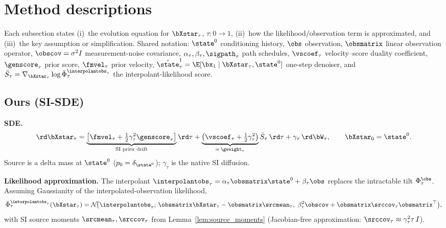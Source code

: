 \section{Method descriptions}\label{appendix:methods}

Each subsection states (i)~the evolution equation for $\bXstar_\tau$, $\tau:0\!\to\!1$, (ii)~how the likelihood/observation term is approximated, and (iii)~the key assumption or simplification.
Shared notation: $\state^0$ conditioning history, $\obs$ observation, $\obsmatrix$ linear observation operator,
$\obscov=\sigma^2 I$ measurement-noise covariance, $\alpha_\tau,\beta_\tau,\sigpath_\tau$ path schedules,
$\vscoef_\tau$ velocity--score duality coefficient, $\genscore_\tau$ prior score, $\fmvel_\tau$ prior velocity,
$\hat{\state}_\tau^1 = \E[\bx_1\mid\bXstar_\tau,\state^0]$ one-step denoiser,
and $\bar{S}_\tau = \nabla_{\bXstar_\tau}\log\bar\Phi_\tau^{\interpolantobs_\tau}$ the interpolant-likelihood score.

\subsection{Ours (SI-SDE)}\label{appendix:method:si_sde}

\textbf{SDE.}
\begin{align}
  \rd\bXstar_\tau
  = \underbrace{\bigl[\fmvel_\tau + \tfrac12\gamma_\tau^2\genscore_\tau\bigr]}_{\text{SI prior drift}}\rd\tau
  + \underbrace{\bigl(\vscoef_\tau + \tfrac12\gamma_\tau^2\bigr)}_{=\,\gweight_\tau}\bar{S}_\tau\,\rd\tau
  + \gamma_\tau\,\rd\bW_\tau,
  \qquad \bXstar_0 = \state^0.
\end{align}
Source is a delta mass at $\state^0$ ($p_0=\delta_{\state^0}$); $\gamma_\tau$ is the native SI diffusion.

\textbf{Likelihood approximation.}
The interpolant $\interpolantobs_\tau = \alpha_\tau\obsmatrix\state^0 + \beta_\tau\obs$ replaces the intractable tilt $\Phi_\tau^{\obs}$.
Assuming Gaussianity of the interpolated-observation likelihood,
\begin{align}
  \bar\Phi_\tau^{\interpolantobs_\tau}(\bXstar_\tau)
  = \mathcal{N}\!\bigl(\interpolantobs_\tau;\,\obsmatrix\bXstar_\tau - \obsmatrix\srcmean_\tau,\;
    \beta_\tau^2\obscov + \obsmatrix\srccov_\tau\obsmatrix^\top\bigr),
\end{align}
with SI source moments $\srcmean_\tau,\srccov_\tau$ from Lemma~\ref{lem:source_moments} (Jacobian-free approximation: $\srccov_\tau\approx\gamma_\tau^2\tau\,I$).

